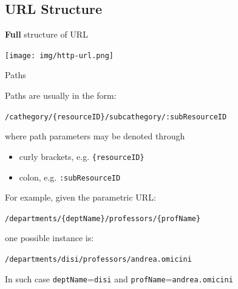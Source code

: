 \documentclass[presentation]{beamer}\mode<presentation>{\usetheme{AMSBolognaFC}}
\begin{document}
\subsection{URL Structure}

\begin{frame}{\textbf{Full} structure of URL}
    \begin{center}
        \texttt{[image: img/http-url.png]}
    \end{center}
\end{frame}

\begin{frame}{Paths}
    \begin{block}{Paths are usually in the form:}
        \begin{center}
            \texttt{/cathegory/\alert{\{resourceID\}}/subcathegory/\alert{:subResourceID}}
        \end{center}
        where \alert{path parameters} may be denoted through
        \begin{itemize}
            \item curly brackets, e.g. \texttt{\{resourceID\}}
            \item colon, e.g. \texttt{:subResourceID}
        \end{itemize}
    \end{block}

    \begin{exampleblock}{For example, given the parametric URL:}%
        \begin{center}
            \texttt{/departments/\alert{\{deptName\}}/professors/\alert{\{profName\}}}
        \end{center}
        one possible instance is:
        \begin{center}
            \texttt{/departments/disi/professors/andrea.omicini}
        \end{center}
        In such case \alert{\texttt{deptName}}=\texttt{disi} and \alert{\texttt{profName}}=\texttt{andrea.omicini}

    \end{exampleblock}

\end{frame}
\end{document}

